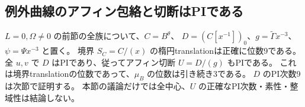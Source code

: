 \subsection{例外曲線のアフィン包絡と切断はPIである}
\label{subsec:cubic-third-root-unit-boundary-L-PI}
\begin{theorem}
\label{thm:cubic-third-root-unit-boundary-L-PI}
$L=0,\Omega\ne0$ の前節の全族について、$C=B^\theta$、
$D=(C[x^{-1}])_0$、$g=\widetilde\Gamma x^{-3}$、$\psi=\Psi x^{-3}$ と置く。
境界 $S_C=C/(x)$ の楕円translationは正確に位数9である。
全 $u,v$ で $D$ はPIであり、従ってアフィン切断 $U=D/(g)$ もPIである。
これは境界translationの位数であって、$\mu_B$ の位数は引き続き3である。
$D$ のPI次数9は次節で証明する。
本節の議論だけでは全中心、$U$ の正確なPI次数・素性・整域性は結論しない。
\end{theorem}
